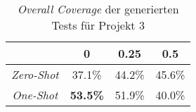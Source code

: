 \bgroup
\def\arraystretch{2}
\begin{table}[H]
	\vspace{.5cm}
	\centering		
	\begin{center}
		\begin{tabular}{|c||c|c|c|}
			\hline 
			& 0 & 0.25 & 0.5 \\
			\hline 
			\hline
			\textit{Zero-Shot} & 37.1\% & 44.2\% & 45.6\% \\
			\hline
			\textit{One-Shot} & \textbf{53.5\%} & 51.9\% & 40.0\% \\
			\hline
		\end{tabular} 
	\end{center}
	\caption{\textit{Overall Coverage} der generierten Tests für Projekt 3}
	\label{fig:o-3}
	\vspace{-.8cm}
\end{table}
\egroup